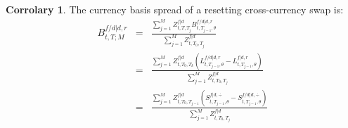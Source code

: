 \documentclass[11pt,english]{amsart}
\newcommand{\QQ}{\mathbb{Q}}
\theoremstyle{definition}
\newtheorem{coro}{Corrolary}
\newtheorem{rema}{Remark}
\begin{document}
%
%
%


%
%



\begin{coro}
The currency basis spread of a resetting cross-currency swap is:
\begin{eqnarray}
  B^{f/d|d,r}_{t,T;M}  
  &=& \frac{\sum_{j=1}^{M}   Z^{f|d}_{t,T,T_j} B^{f/d|d,r}_{t,T_{j-1},\theta} }{\sum_{j=1}^{M}  Z^{f|d}_{t,T_0,T_j}} \nonumber \\
  &=& \frac{ \sum_{j=1}^{M}   Z^{f|d}_{t,T_0,T_{k}} (L^{f/d|d,r}_{t,T_{j-1},\theta}  - L^{f|d,r}_{t,T_{j-1},\theta}  ) }{\sum_{j=1}^{M}  Z^{f|d}_{t,T_0,T_j}} \nonumber \\
  &=& \frac{ \sum_{j=1}^{M}   Z^{f|d}_{t,T_0,T_{j-1}} (S^{f|d,\div}_{t,T_{j-1},\theta}  - S^{f/d|d,\div}_{t,T_{j-1},\theta} ) }{\sum_{j=1}^{M}  Z^{f|d}_{t,T_0,T_j}} 
\end{eqnarray}
\end{coro}
\end{document}
